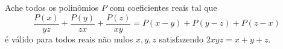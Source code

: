Ache todos os polinômios $P$ com coeficientes reais tal que \[\frac{P(x)}{yz}+\frac{P(y)}{zx}+\frac{P(z)}{xy}=P(x-y)+P(y-z)+P(z-x)\] é válido para todos reais não nulos $x,y,z$ satisfazendo $2xyz=x+y+z$.
